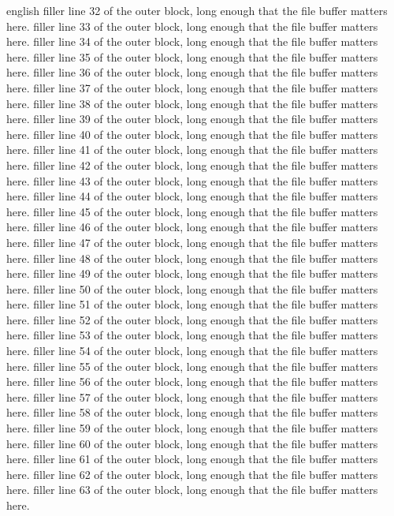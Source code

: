 \documentclass{article}
\begin{document}
\begin{onlyin}{english}
filler line 32 of the outer block, long enough that the file buffer matters here.
filler line 33 of the outer block, long enough that the file buffer matters here.
filler line 34 of the outer block, long enough that the file buffer matters here.
filler line 35 of the outer block, long enough that the file buffer matters here.
filler line 36 of the outer block, long enough that the file buffer matters here.
filler line 37 of the outer block, long enough that the file buffer matters here.
filler line 38 of the outer block, long enough that the file buffer matters here.
filler line 39 of the outer block, long enough that the file buffer matters here.
filler line 40 of the outer block, long enough that the file buffer matters here.
filler line 41 of the outer block, long enough that the file buffer matters here.
filler line 42 of the outer block, long enough that the file buffer matters here.
filler line 43 of the outer block, long enough that the file buffer matters here.
filler line 44 of the outer block, long enough that the file buffer matters here.
filler line 45 of the outer block, long enough that the file buffer matters here.
filler line 46 of the outer block, long enough that the file buffer matters here.
filler line 47 of the outer block, long enough that the file buffer matters here.
filler line 48 of the outer block, long enough that the file buffer matters here.
filler line 49 of the outer block, long enough that the file buffer matters here.
filler line 50 of the outer block, long enough that the file buffer matters here.
filler line 51 of the outer block, long enough that the file buffer matters here.
filler line 52 of the outer block, long enough that the file buffer matters here.
filler line 53 of the outer block, long enough that the file buffer matters here.
filler line 54 of the outer block, long enough that the file buffer matters here.
filler line 55 of the outer block, long enough that the file buffer matters here.
filler line 56 of the outer block, long enough that the file buffer matters here.
filler line 57 of the outer block, long enough that the file buffer matters here.
filler line 58 of the outer block, long enough that the file buffer matters here.
filler line 59 of the outer block, long enough that the file buffer matters here.
filler line 60 of the outer block, long enough that the file buffer matters here.
filler line 61 of the outer block, long enough that the file buffer matters here.
filler line 62 of the outer block, long enough that the file buffer matters here.
filler line 63 of the outer block, long enough that the file buffer matters here.

\end{onlyin}
\end{document}
